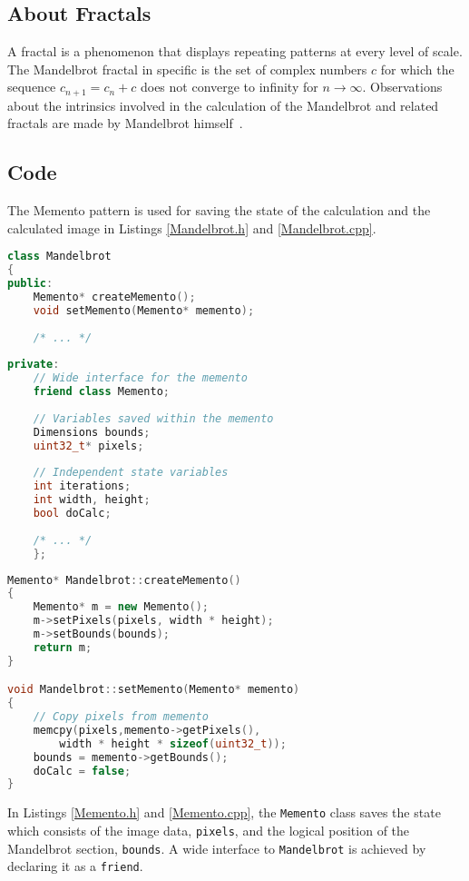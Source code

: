 \documentclass[11pt, a4paper, twoside]{article}
\begin{document}
	\subsection{About Fractals}
	A fractal is a phenomenon that displays repeating patterns at every level of scale. The Mandelbrot fractal in specific is the set of complex numbers $c$ for which the sequence $c_{n+1} = c_n + c$ does not converge to infinity for $n \to \infty$. Observations about the intrinsics involved in the calculation of the Mandelbrot and related fractals are made by Mandelbrot himself~\cite{mandelbrot1980fractal}.
	
	\subsection{Code}
	\label{subsec:code}
	The Memento pattern is used for saving the state of the calculation and the calculated image in Listings \ref{Mandelbrot.h} and \ref{Mandelbrot.cpp}.
	
	\begin{lstlisting}[language=c++, caption={Mandelbrot.h}, label={Mandelbrot.h}]
class Mandelbrot
{
public:
	Memento* createMemento();
	void setMemento(Memento* memento);
	
	/* ... */
	
private:
	// Wide interface for the memento
	friend class Memento;
	
	// Variables saved within the memento
	Dimensions bounds;
	uint32_t* pixels;
	
	// Independent state variables
	int iterations;
	int width, height;
	bool doCalc;
	
	/* ... */
	};
	\end{lstlisting}
	
	\begin{lstlisting}[language=c++, caption={Mandelbrot.cpp}, label={Mandelbrot.cpp}]
Memento* Mandelbrot::createMemento()
{
	Memento* m = new Memento();
	m->setPixels(pixels, width * height);
	m->setBounds(bounds);
	return m;
}

void Mandelbrot::setMemento(Memento* memento)
{
	// Copy pixels from memento
	memcpy(pixels,memento->getPixels(),
		width * height * sizeof(uint32_t));
	bounds = memento->getBounds();
	doCalc = false;
}
	\end{lstlisting}
	
	In Listings \ref{Memento.h} and \ref{Memento.cpp}, the \verb|Memento| class saves the state which consists of the image data, \verb|pixels|, and the logical position of the Mandelbrot section, \verb|bounds|. A wide interface to \verb|Mandelbrot| is achieved by declaring it as a \verb|friend|.
	
\end{document}
